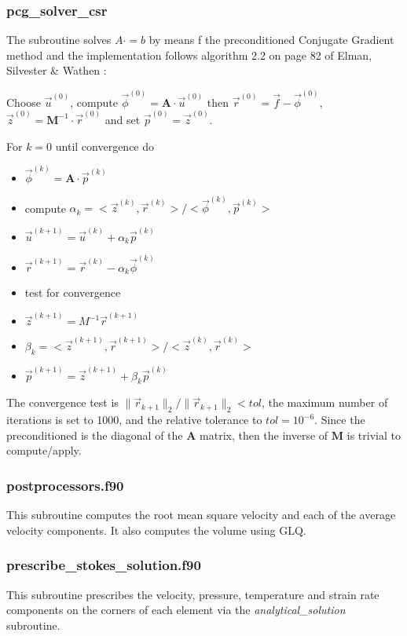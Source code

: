  \subsubsection{pcg\_solver\_csr}
 The subroutine solves $A\cdot = b$ by means f the preconditioned Conjugate Gradient method
 and the implementation follows algorithm 2.2 on page 82 of Elman, Silvester \&
 Wathen \cite{elsw}:
 
 Choose ${\vec u}^{(0)}$, compute ${\vec \phi}^{(0)}={\bm A}\cdot {\vec u}^{(0)}$ 
 then ${\vec r}^{(0)}={\vec f}-{\vec \phi}^{(0)}$, 
 ${\vec z}^{(0)}={\bm M}^{-1}\cdot {\vec r}^{(0)}$ and set ${\vec p}^{(0)}={\vec z}^{(0)}$.
 
 For $k=0$ until convergence do
 \begin{itemize}
 \item ${\vec \phi}^{(k)}={\bm A}\cdot {\vec p}^{(k)}$
 \item compute $\alpha_k = <{\vec z}^{(k)},{\vec r}^{(k)}>/<{\vec \phi}^{(k)},{\vec p}^{(k)}>$
 \item ${\vec u}^{(k+1)}={\vec u}^{(k)}+\alpha_k {\vec p}^{(k)}$
 \item ${\vec r}^{(k+1)}={\vec r}^{(k)}-\alpha_k{\vec \phi}^{(k)}$
 \item test for convergence
 \item ${\vec z}^{(k+1)}=M^{-1} {\vec r}^{(k+1)}$
 \item $\beta_k= <{\vec z}^{(k+1)},{\vec r}^{(k+1)}>/<{\vec z}^{(k)},{\vec r}^{(k)}>$
 \item ${\vec p}^{(k+1)}={\vec z}^{(k+1)}+\beta_k {\vec p}^{(k)}$
 \end{itemize}
 The convergence test is $\| \vec{r}_{k+1} \|_2/ \| \vec{r}_{k+1} \|_2 < tol$, 
 the maximum number of iterations is set to 1000, and the relative tolerance to $tol=10^{-6}$.
 Since the preconditioned is the diagonal of the ${\bm A}$ matrix, then the inverse of 
 ${\bm M}$ is trivial to compute/apply. 
 \subsubsection{postprocessors.f90}
 This subroutine computes the root mean square velocity
 and each of the average velocity components. It also 
 computes the volume using GLQ.
 \subsubsection{prescribe\_stokes\_solution.f90}
 This subroutine prescribes the velocity, pressure, temperature and strain rate components
 on the corners of each element via the {\sl analytical\_solution} subroutine.
